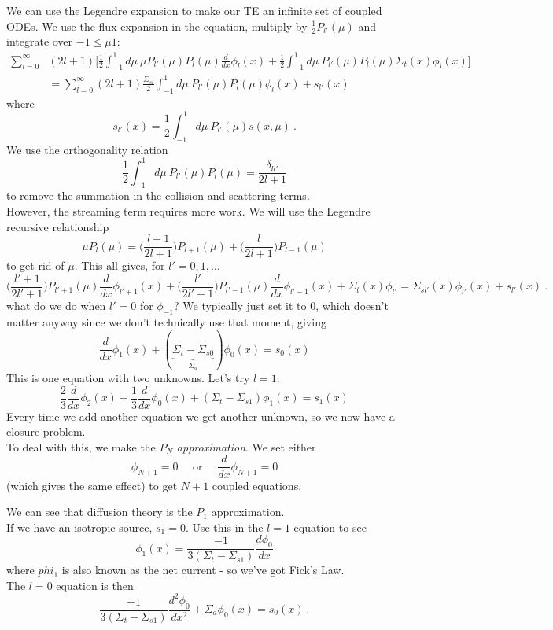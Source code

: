 \documentclass[12pt]{article}
\begin{document}
We can use the Legendre expansion to make our TE an infinite set of coupled ODEs. We use the flux expansion in the equation, multiply by $\frac{1}{2}P_{l'}(\mu)$ and integrate over $-1 \leq \mu 1$:
\begin{align*}
\sum_{l=0}^{\infty} &(2l+1)\biggl[ \frac{1}{2} \int_{-1}^1 d\mu\: \mu P_{l'}(\mu) P_l(\mu) \frac{d}{d x}\phi_l(x) + \frac{1}{2} \int_{-1}^1 d\mu\: P_{l'}(\mu) P_l(\mu) \Sigma_t(x)\phi_l(x) \biggr] \\
&= \sum_{l=0}^{\infty} (2l+1)\frac{\Sigma_{sl}}{2}\int_{-1}^1 d\mu\: P_{l'}(\mu) P_l(\mu) \phi_l(x) + s_{l'}(x)
\end{align*}
where
\[
s_{l'}(x) = \frac{1}{2} \int_{-1}^1 d\mu\:P_{l'}(\mu) s(x,\mu)\:.
\]
We use the orthogonality relation
\[
\frac{1}{2} \int_{-1}^1 d\mu\: P_{l'}(\mu) P_l(\mu) = \frac{\delta_{l l'}}{2l+1}
\]
to remove the summation in the collision and scattering terms. \\
However, the streaming term requires more work. We will use the Legendre recursive relationship
\[
\mu P_l(\mu) = \bigl(\frac{l+1}{2l+1}\bigr)P_{l+1}(\mu) + \bigl(\frac{l}{2l+1}\bigr)P_{l-1}(\mu)
\]
to get rid of $\mu$. This all gives, for $l' = 0, 1, \dots$
\[
\bigl(\frac{l'+1}{2l'+1}\bigr)P_{l'+1}(\mu)\frac{d}{d x}\phi_{l'+1}(x) + \bigl(\frac{l'}{2l'+1}\bigr)P_{l'-1}(\mu)\frac{d}{d x}\phi_{l'-1}(x) + \Sigma_t(x) \phi_{l'} = \Sigma_{sl'}(x)\phi_{l'}(x) + s_{l'}(x)\:.
\]
what do we do when $l'=0$ for $\phi_{-1}$? We typically just set it to $0$, which doesn't matter anyway since we don't technically use that moment, giving
\[
\frac{d}{dx}\phi_1(x) + (\underbrace{\Sigma_t - \Sigma_{s0}}_{\Sigma_a})\phi_0(x) = s_0(x)
\]
This is one equation with two unknowns. Let's try $l=1$:
\[
\frac{2}{3}\frac{d}{dx}\phi_2(x) + \frac{1}{3}\frac{d}{dx}\phi_0(x) + (\Sigma_t - \Sigma_{s1})\phi_1(x) = s_1(x)
\]
Every time we add another equation we get another unknown, so we now have a closure problem.\\
To deal with this, we make the $P_N$ \textit{approximation}. We set either 
\[\phi_{N+1} = 0 \quad\text{ or }\quad\frac{d}{dx}\phi_{N+1}=0
\]
(which gives the same effect) to get $N+1$ coupled equations. 

We can see that diffusion theory is the $P_1$ approximation.\\
If we have an isotropic source, $s_1=0$. Use this in the $l=1$ equation to see
\[
\phi_1(x) = \frac{-1}{3(\Sigma_t - \Sigma_{s1})}\frac{d \phi_0}{dx}
\]
where $phi_1$ is also known as the net current - so we've got Fick's Law.\\
The $l=0$ equation is then
\[
\frac{-1}{3(\Sigma_t - \Sigma_{s1})}\frac{d^2 \phi_0}{dx^2} + \Sigma_a \phi_0(x) = s_0(x)\:.
\]
\end{document}
